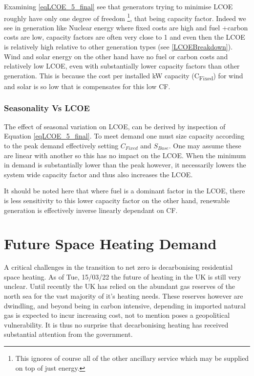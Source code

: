 \documentclass[11pt]{article}
\numberwithin{equation}{section}
\begin{document}
Examining \ref{eqLCOE_5_final} see that generators trying to minimise LCOE roughly have only one degree of freedom \footnote{This ignores of course all of the other ancillary service which may be supplied on top of just energy.}, that being capacity factor. Indeed we see in generation like Nuclear energy where fixed costs are high and fuel +carbon costs are low, capacity factors are often very close to 1 and even then the LCOE is relatively high relative to other generation types (see \ref{LCOEBreakdown}). Wind and solar energy on the other hand have no fuel or carbon costs and relatively low LCOE, even with substantially lower capacity factors than other generation. This is because the cost per installed kW capacity (C\textsubscript{Fixed}) for wind and solar is so low that is compensates for this low CF.
\subsubsection{Seasonality Vs LCOE \label{secSeasonalityVsLSCO}}
\label{sec:org6720130}
The effect of seasonal variation on LCOE, can be derived by inspection of Equation \ref{eqLCOE_5_final}. To meet demand one must size capacity according to the peak demand effectively setting \(C_{Fixed}\) and \(S_{Base}\). One may assume these are linear with another so this has no impact on the LCOE. When the minimum in demand is substantially lower than the peak however, it necessarily lowers the system wide capacity factor and thus also increases the LCOE.

It should be noted here that where fuel is a dominant factor in the LCOE, there is less sensitivity to this lower capacity factor on the other hand, renewable generation is effectively inverse linearly dependant on CF.

\section{Future Space Heating Demand \label{secHeating}}
\label{sec:org96a8374}
A critical challenges in the transition to net zero is decarbonising residential space heating. As of Tue, 15/03/22 the future of heating in the UK is still very unclear. Until recently the UK has relied on the abundant gas reserves of the north sea for the vast majority of it's heating needs. These reserves however are dwindling, and beyond being in carbon intensive, depending in imported natural gas is expected to incur increasing cost, not to mention poses a geopolitical vulnerability. It is thus no surprise that decarbonising heating has received substantial attention from the government.
\end{document}
